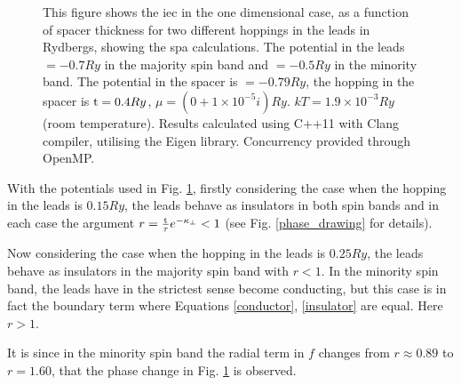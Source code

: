 \documentclass[a4paper, 12pt]{article}
\begin{document}
	\begin{figure}[H]
\caption{\footnotesize This figure shows the \gls{iec} in the one dimensional case, as a function of spacer thickness for two different hoppings in the leads in Rydbergs, showing the \gls{spa} calculations.
The potential in the leads $= -0.7Ry$ in the majority spin band and $=-0.5Ry$ in the minority band. The potential in the spacer is $= -0.79Ry$, the hopping in the spacer is ${\rm t} = 0.4Ry$, $\mu= (0 + 1\times 10^{-5}i)Ry$. $kT = 1.9\times 10^{-3}Ry$ (room temperature).  Results calculated using C++11 with Clang compiler, utilising the Eigen library. Concurrency provided through OpenMP.
}\label{phase_graph}
\end{figure}
With the potentials used in Fig. \ref{phase_graph}, firstly considering the case when the hopping in the leads is $0.15Ry$, the leads behave as insulators in both spin bands and in each case the argument $r=\frac{\rm t}{\tau}e^{-\kappa_\perp}<1$ (see Fig. \ref{phase_drawing} for details). 
\\\par Now considering the case when the hopping in the leads is $0.25Ry$, the leads behave as insulators in the majority spin band with $r<1$. In the minority spin band, the leads have in the strictest sense become conducting, but this case is in fact the boundary term where Equations \eqref{conductor}, \eqref{insulator} are equal. Here $r>1$.
\\\par It is since in the minority spin band the radial term in $f$ changes from $r\approx0.89$ to $r=1.60$, that the phase change in Fig. \ref{phase_graph} is observed.
\end{document}
